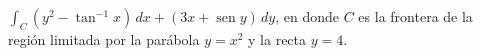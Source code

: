 \item $\int_C (y^2 - \tan^{-1} x) \, dx + (3x + \operatorname{sen} y) \, dy$, en donde $C$ es la frontera de la región limitada por la parábola $y = x^2$ y la recta $y = 4$.
